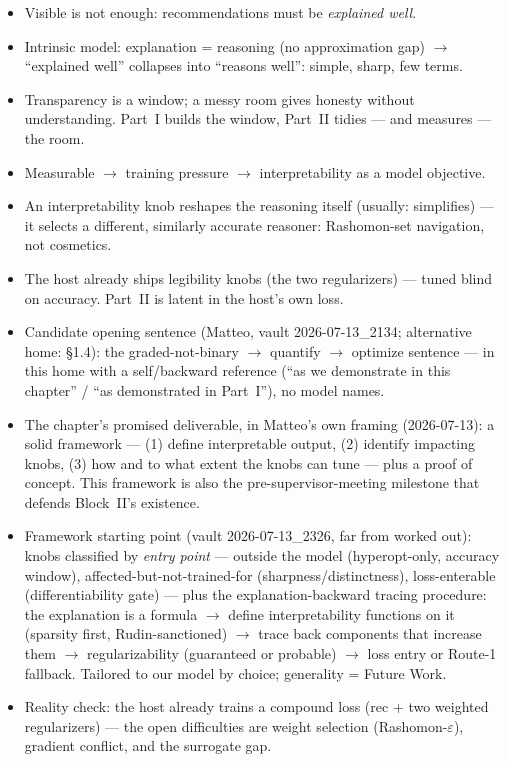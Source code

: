 \begin{itemize}
    \item Visible is not enough: recommendations must be \emph{explained well}.
    \item Intrinsic model: explanation = reasoning (no approximation gap) $\to$ ``explained well'' collapses into ``reasons well'': simple, sharp, few terms.
    \item Transparency is a window; a messy room gives honesty without understanding. Part~I builds the window, Part~II tidies — and measures — the room.
    \item Measurable $\to$ training pressure $\to$ interpretability as a model objective.
    \item An interpretability knob reshapes the reasoning itself (usually: simplifies) — it selects a different, similarly accurate reasoner: Rashomon-set navigation, not cosmetics.
    \item The host already ships legibility knobs (the two regularizers) — tuned blind on accuracy. Part~II is latent in the host's own loss.
    \item Candidate opening sentence (Matteo, vault 2026-07-13\_2134; alternative home: §1.4): the graded-not-binary $\to$ quantify $\to$ optimize sentence — in this home with a self/backward reference (``as we demonstrate in this chapter'' / ``as demonstrated in Part~I''), no model names.
    \item The chapter's promised deliverable, in Matteo's own framing (2026-07-13): a solid framework — (1) define interpretable output, (2) identify impacting knobs, (3) how and to what extent the knobs can tune — plus a proof of concept. This framework is also the pre-supervisor-meeting milestone that defends Block~II's existence.
    \item Framework starting point (vault 2026-07-13\_2326, far from worked out): knobs classified by \emph{entry point} — outside the model (hyperopt-only, accuracy window), affected-but-not-trained-for (sharpness/distinctness), loss-enterable (differentiability gate) — plus the explanation-backward tracing procedure: the explanation is a formula $\to$ define interpretability functions on it (sparsity first, Rudin-sanctioned) $\to$ trace back components that increase them $\to$ regularizability (guaranteed or probable) $\to$ loss entry or Route-1 fallback. Tailored to our model by choice; generality = Future Work.
    \item Reality check: the host already trains a compound loss (rec + two weighted regularizers) — the open difficulties are weight selection (Rashomon-$\varepsilon$), gradient conflict, and the surrogate gap.
\end{itemize}

